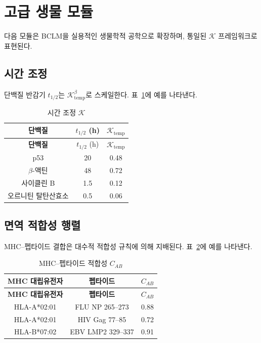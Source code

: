 \documentclass[12pt,a4paper]{article}
\newcommand{\REL}{\mathcal{K}}          %
\begin{document}
	\section{고급 생물 모듈}
	\label{sec:modules}
	다음 모듈은 BCLM을 실용적인 생물학적 공학으로 확장하며, 통일된 \(\REL\) 프레임워크로 표현된다.
	
	\subsection{시간 조정}
	단백질 반감기 \(t_{1/2}\)는 \(\REL_{\mathrm{temp}}^{\beta}\)로 스케일한다. 표~\ref{tab:temporal}에 예를 나타낸다.
	
	\begin{longtable}{|c|c|c|}
		\caption{시간 조정 \(\REL\)}\label{tab:temporal}\\
		\hline
		\textbf{단백질} & \(t_{1/2}\) (h) & \(\REL_{\mathrm{temp}}\) \\
		\hline
		\endfirsthead
		\hline
		\textbf{단백질} & \(t_{1/2}\) (h) & \(\REL_{\mathrm{temp}}\) \\
		\hline
		\endhead
		\hline
		p53 & 20 & 0.48 \\
		\(\beta\)-액틴 & 48 & 0.72 \\
		사이클린 B & 1.5 & 0.12 \\
		오르니틴 탈탄산효소 & 0.5 & 0.06 \\
		\hline
	\end{longtable}
	
	\subsection{면역 적합성 행렬}
	MHC–펩타이드 결합은 대수적 적합성 규칙에 의해 지배된다. 표~\ref{tab:mhc}에 예를 나타낸다.
	
	\begin{longtable}{|c|c|c|}
		\caption{MHC–펩타이드 적합성 \(C_{AB}\)}\label{tab:mhc}\\
		\hline
		\textbf{MHC 대립유전자} & \textbf{펩타이드} & \(C_{AB}\) \\
		\hline
		\endfirsthead
		\hline
		\textbf{MHC 대립유전자} & \textbf{펩타이드} & \(C_{AB}\) \\
		\hline
		\endhead
		\hline
		HLA-A*02:01 & FLU NP 265–273 & 0.88 \\
		HLA-A*02:01 & HIV Gag 77–85 & 0.72 \\
		HLA-B*07:02 & EBV LMP2 329–337 & 0.91 \\
		\hline
	\end{longtable}
	
\end{document}
